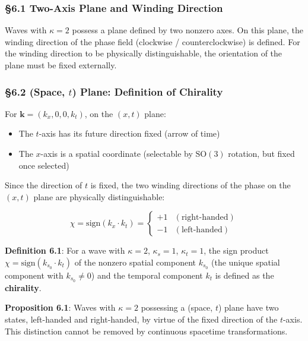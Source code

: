 \documentclass[
  a4paper,11pt]{article}
\providecommand{\tightlist}{%
  \setlength{\itemsep}{0pt}\setlength{\parskip}{0pt}}
\theoremstyle{definition}
\theoremstyle{remark}
\begin{document}
\subsubsection{§6.1 Two-Axis Plane and Winding
Direction}\label{two-axis-plane-and-winding-direction}

Waves with \(\kappa = 2\) possess a plane defined by two nonzero axes.
On this plane, the winding direction of the phase field (clockwise /
counterclockwise) is defined. For the winding direction to be physically
distinguishable, the orientation of the plane must be fixed externally.

\subsubsection{\texorpdfstring{§6.2 (Space, \(t\)) Plane: Definition of
Chirality}{§6.2 (Space, t) Plane: Definition of Chirality}}\label{space-t-plane-definition-of-chirality}

For \(\mathbf{k} = (k_x, 0, 0, k_t)\), on the \((x, t)\) plane:

\begin{itemize}
\tightlist
\item
  The \(t\)-axis has its future direction fixed (arrow of time)
\item
  The \(x\)-axis is a spatial coordinate (selectable by
  \(\mathrm{SO}(3)\) rotation, but fixed once selected)
\end{itemize}

Since the direction of \(t\) is fixed, the two winding directions of the
phase on the \((x, t)\) plane are physically distinguishable:

\[\chi = \mathrm{sign}(k_x \cdot k_t) = \begin{cases} +1 & (\text{right-handed}) \\ -1 & (\text{left-handed}) \end{cases}\]

\textbf{Definition 6.1}: For a wave with \(\kappa = 2\),
\(\kappa_s = 1\), \(\kappa_t = 1\), the sign product
\(\chi = \mathrm{sign}(k_{s_0} \cdot k_t)\) of the nonzero spatial
component \(k_{s_0}\) (the unique spatial component with
\(k_{s_0} \neq 0\)) and the temporal component \(k_t\) is defined as the
\textbf{chirality}.

\textbf{Proposition 6.1}: Waves with \(\kappa = 2\) possessing a (space,
\(t\)) plane have two states, left-handed and right-handed, by virtue of
the fixed direction of the \(t\)-axis. This distinction cannot be
removed by continuous spacetime transformations.
\end{document}
